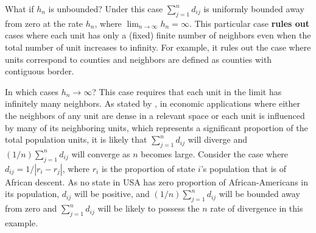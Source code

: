 \documentclass[english,12pt]{book}\usepackage[]{graphicx}\usepackage[]{xcolor}
\begin{document}



What if $h_n$ is unbounded? Under this case $\sum_{j = 1}^nd_{ij}$ is uniformly bounded away from zero at the rate $h_n$, where $\lim_{n\to \infty}h_n = \infty$. This particular case \textbf{rules out} cases where each unit has only a (fixed) finite number of neighbors even when the total number of unit increases to infinity. For example, it rules out the case where units correspond to counties and neighbors are defined as counties with contiguous border.

In which cases $h_n \to \infty$? This case requires that each unit in the limit has infinitely many neighbors. As stated by \cite{lee2002consistency}, in economic applications where either the neighbors of any unit are dense in a relevant space or each unit is influenced by many of its neighboring units, which represents a significant proportion of the total population units, it is likely that $\sum_{j = 1}^nd_{ij}$ will diverge and $(1/n)\sum_{j = 1}^nd_{ij}$ will converge as $n$ becomes large. Consider the case where $d_{ij} = 1 / \left|r_i - r_j\right|$, where $r_i$ is the proportion of state $i$'s population that is of African descent. As no state in USA has zero proportion of African-Americans in its population, $d_{ij}$ will be positive, and $(1/n)\sum_{j = 1}^nd_{ij}$ will be bounded away from zero and $\sum_{j = 1}^nd_{ij}$ will be likely to possess the $n$ rate of divergence in this example.
\end{document}
